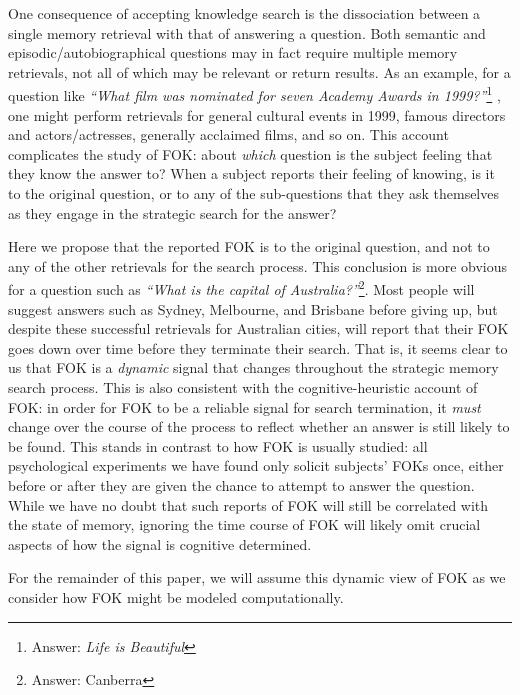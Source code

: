 \documentclass[10pt,letterpaper]{article}
\newcommand{\question}[2]{\emph{``#1''}\footnote{Answer: #2}}
\begin{document}
One consequence of accepting knowledge search is the dissociation between a single memory retrieval with that of answering a question.
Both semantic and episodic/autobiographical questions may in fact require multiple memory retrievals, not all of which may be relevant or return results.
As an example, for a question like \question{What film was nominated for seven Academy Awards in 1999?}{\emph{Life is Beautiful}} \cite{Norman2016TheRelationshipBetween}, one might perform retrievals for general cultural events in 1999, famous directors and actors/actresses, generally acclaimed films, and so on.
This account complicates the study of FOK: about \emph{which} question is the subject feeling that they know the answer to?
When a subject reports their feeling of knowing, is it to the original question, or to any of the sub-questions that they ask themselves as they engage in the strategic search for the answer?

Here we propose that the reported FOK is to the original question, and not to any of the other retrievals for the search process.
This conclusion is more obvious for a question such as \question{What is the capital of Australia?}{Canberra}.
Most people will suggest answers such as Sydney, Melbourne, and Brisbane before giving up, but despite these successful retrievals for Australian cities, will report that their FOK goes down over time before they terminate their search.
That is, it seems clear to us that FOK is a \emph{dynamic} signal that changes throughout the strategic memory search process.
This is also consistent with the cognitive-heuristic account of FOK: in order for FOK to be a reliable signal for search termination, it \emph{must} change over the course of the process to reflect whether an answer is still likely to be found.
This stands in contrast to how FOK is usually studied: all psychological experiments we have found only solicit subjects' FOKs once, either before or after they are given the chance to attempt to answer the question. %
While we have no doubt that such reports of FOK will still be correlated with the state of memory, ignoring the time course of FOK will likely omit crucial aspects of how the signal is cognitive determined.

For the remainder of this paper, we will assume this dynamic view of FOK as we consider how FOK might be modeled computationally.
\end{document}

